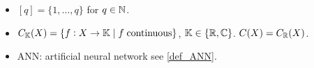 



\begin{itemize}
	\item $[q] = \{1,\dots,q\}$ for $q\in \mathbb{N}$.
	\item $C_{\mathbb{K}}(X) = \{ f : X \to \mathbb{K} \mid f \; \text{continuous} \}$,
		$\mathbb{K} \in \{ \mathbb{R}, \mathbb{C} \}$. $C(X) = C_\mathbb{R}(X)$.
	\item ANN: artificial neural network see \cref{def_ANN}.
\end{itemize}
